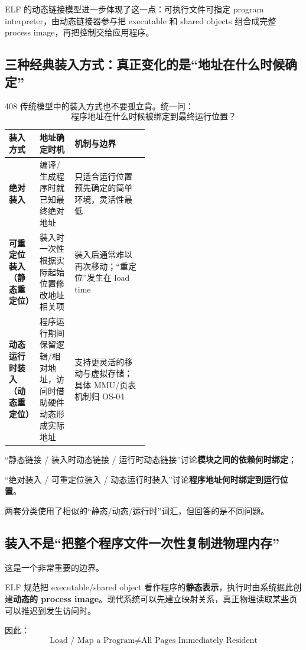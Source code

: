\documentclass[11pt,a4paper]{ctexart}
\newcommand{\kw}[1]{\textbf{#1}}
\begin{document}
ELF 的动态链接模型进一步体现了这一点：可执行文件可指定 program interpreter，由动态链接器参与把 executable 和 shared objects 组合成完整 process image，再把控制交给应用程序。

\subsection{三种经典装入方式：真正变化的是“地址在什么时候确定”}

408 传统模型中的装入方式也不要孤立背。统一问：
\[
\boxed{\text{程序地址在什么时候被绑定到最终运行位置？}}
\]

\begin{center}
\begin{tabularx}{\linewidth}{>{\bfseries}p{0.22\linewidth} p{0.25\linewidth} X}
\toprule
装入方式 & 地址确定时机 & 机制与边界\\
\midrule
绝对装入 & 编译/生成程序时就已知最终绝对地址 & 只适合运行位置预先确定的简单环境，灵活性最低\\
可重定位装入（静态重定位） & 装入时一次性根据实际起始位置修改地址相关项 & 装入后通常难以再次移动；“重定位”发生在 load time\\
动态运行时装入（动态重定位） & 程序运行期间保留逻辑/相对地址，访问时借助硬件动态形成实际地址 & 支持更灵活的移动与虚拟存储；具体 MMU/页表机制归 OS-04\\
\bottomrule
\end{tabularx}
\end{center}

\begin{warn}
“静态链接 / 装入时动态链接 / 运行时动态链接”讨论\kw{模块之间的依赖何时绑定}；

“绝对装入 / 可重定位装入 / 动态运行时装入”讨论\kw{程序地址何时绑定到运行位置}。

两套分类使用了相似的“静态/动态/运行时”词汇，但回答的是不同问题。
\end{warn}

\subsection{装入不是“把整个程序文件一次性复制进物理内存”}

这是一个非常重要的边界。

ELF 规范把 executable/shared object 看作程序的\kw{静态表示}，执行时由系统据此创建\kw{动态的 process image}。现代系统可以先建立映射关系，真正物理读取某些页可以推迟到发生访问时。

因此：
\[
\boxed{\text{Load / Map a Program}\neq\text{All Pages Immediately Resident}}
\]
\end{document}
